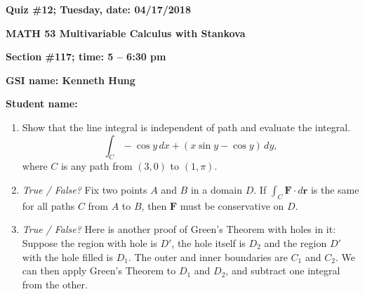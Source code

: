 \documentclass{article}
\newcommand{\rr}{\mathbf{r}}
\begin{document}
{\bf Quiz \#12; Tuesday, date: 04/17/2018}

{\bf MATH 53 Multivariable Calculus with Stankova}

{\bf Section \#117; time: 5 -- 6:30 pm}

{\bf GSI name: Kenneth Hung}

{\bf Student name:}

\vspace*{0.25in}

\begin{enumerate}
\item Show that the line integral is independent of path and evaluate the integral.
\[
\int_C -\cos y \,dx + (x \sin y - \cos y) \,dy,
\]
where $C$ is any path from $(3, 0)$ to $(1, \pi)$.

\item {\em True / False?} Fix two points $A$ and $B$ in a domain $D$. If $\int_C \mathbf{F} \cdot d\rr$ is the same for all paths $C$ from $A$ to $B$, then $\mathbf{F}$ must be conservative on $D$.

\item {\em True / False?} Here is another proof of Green's Theorem with holes in it: Suppose the region with hole is $D'$, the hole itself is $D_2$ and the region $D'$ with the hole filled is $D_1$. The outer and inner boundaries are $C_1$ and $C_2$. We can then apply Green's Theorem to $D_1$ and $D_2$, and subtract one integral from the other.
\end{enumerate}
\end{document}
